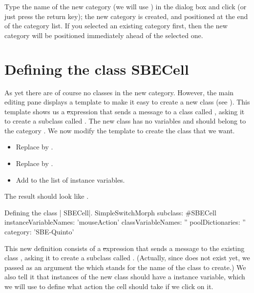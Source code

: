 \documentclass[a4paper,10pt,twoside]{book}
\begin{document}
Type the name of the new category (we will use ) in the dialog box and click  (or just press the return key); the new category is created, and positioned at the end of the category list.
If you selected an existing category first, then the new category will be positioned immediately ahead of the selected one.

\section{Defining the class SBECell}

As yet there are  of course no classes in the new category.
However, the main editing pane displays a template to make it easy to create a new class (see ).
This template shows us a \st expression that sends a message to a class called , asking it to create a subclass called .
The new class has no variables and should belong to the category .
We now modify the template to create the class that we want.

\begin{itemize}
  \item Replace  by .
  \item Replace  by .
  \item Add  to the list of instance variables.
\end{itemize}
The result should look like .

\begin{classdef}[firstClassDef]{Defining the class \ct| SBECell|.}
SimpleSwitchMorph subclass: #SBECell
   instanceVariableNames: 'mouseAction'
   classVariableNames: ''
   poolDictionaries: ''
   category: 'SBE-Quinto'
\end{classdef}

This new definition consists of a \st expression that sends a message to the existing class , asking it to create a subclass called .
(Actually, since  does not exist yet, we passed as an argument the   which stands for the name of the class to create.)
We also tell it that instances of the new class should have a  instance variable, which we will use to define what action the cell should take if we click on it.
\end{document}
